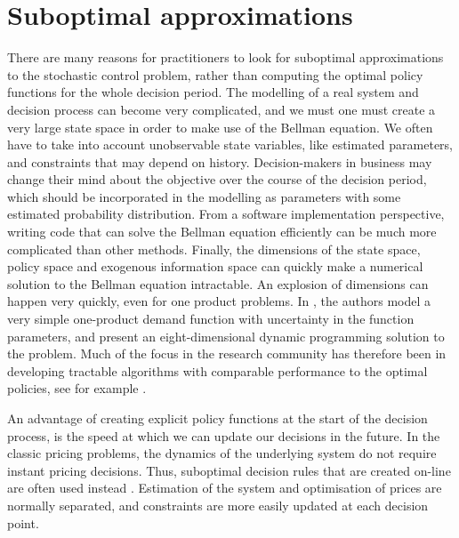 \documentclass[main.tex]{subfiles}
\begin{document}



\listoftodos

\section{Suboptimal approximations}
There are many reasons for practitioners to look for suboptimal
approximations to the stochastic control problem, rather than
computing the optimal policy functions for the whole decision period.
The modelling of a real system and decision process can become very
complicated, and  we must one must create a very
large state space in order to make use of the Bellman equation.
We often have to take into account unobservable
state variables, like estimated parameters, and constraints that may
depend on history. Decision-makers in business may change their mind
about the objective over the course of the decision period, which should
be incorporated in the modelling as parameters with some estimated
probability distribution.
From a software implementation perspective, writing code that can
solve the Bellman equation efficiently can be much more complicated
than other methods.
Finally, the dimensions of the state space, policy space and exogenous
information space can quickly make a numerical solution to the Bellman
equation intractable. An explosion of dimensions can happen very
quickly, even for one product problems. In
\citep{bertsimas2001dynamic}, the authors model a very simple
one-product demand function with uncertainty in the function
parameters, and present an eight-dimensional dynamic programming
solution to the problem.
Much of the focus in the research community has therefore been in
developing tractable algorithms with comparable performance to the
optimal policies, see for example
\citep{powell2011approximate,bertsekas2012dynamic}.

An advantage of creating explicit policy functions at the start of the decision
process, is the speed at which we can update our decisions in the
future. In the classic pricing problems, the dynamics of the
underlying system do not require instant pricing decisions. Thus,
suboptimal decision rules that are created on-line are often used
instead \citep{talluri2006theory}. Estimation of the system and optimisation of prices are
normally separated, and constraints are more easily updated at each
decision point.
\end{document}
